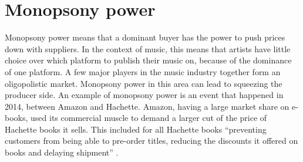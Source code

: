 \section{Monopsony power}
Monopsony power means that a dominant buyer has the power to push prices down with suppliers. In the context of music, this means that artists have little choice over which platform to publish their music on, because of the dominance of one platform. A few major players in the music industry together form an oligopolistic market. Monopsony power in this area can lead to squeezing the producer side. 
An example of monopsony power is an event that happened in 2014, between Amazon and Hachette. Amazon, having a large market share on e-books, used its commercial muscle to demand a larger cut of the price of Hachette books it sells. This included for all Hachette books ``preventing customers from being able to pre-order titles, reducing the discounts it offered on books and delaying shipment'' \citep{theguardian2014amazon}. 

